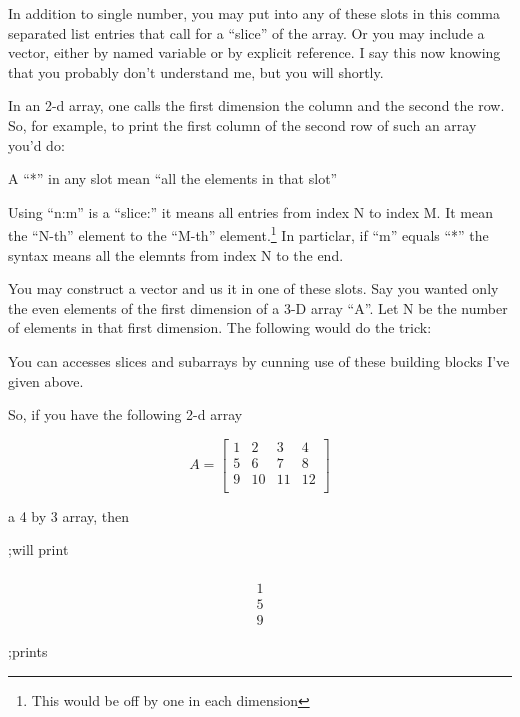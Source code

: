   In addition to single number, you may put into any of these slots in
  this comma separated list entries that call for a ``slice'' of the
  array. Or you may include a vector, either by named variable or by
  explicit reference. I say this now knowing that you probably don't
  understand me, but you will shortly.

  In an 2-d array, one calls the first dimension the column and the
  second the row. So, for example, to print the first column of the
  second row of such an array you'd do:



  A ``*'' in any slot mean ``all the elements in that slot''

  Using ``n:m'' is a ``slice:'' it means all entries from index N to
  index M. It  mean the ``N-th'' element to the
  ``M-th'' element.\footnote{This would be off by one in each
  dimension} In particlar, if ``m'' equals ``*'' the syntax means all
  the elemnts from index N to the end.

  You may construct a vector and us it in one of these slots. Say you
  wanted only the even elements of the first dimension of a 3-D
  array ``A''. Let N be the number of elements in that first dimension. The
  following would do the trick:



  You can accesses slices and subarrays by cunning use of these
  building blocks I've given above.

  So, if you have the following 2-d array

  \[ A = \left[ \begin{array}{cccc}
        1 & 2 & 3   & 4 \\
        5 & 6 & 7   & 8 \\
        9 & 10 & 11 & 12 \\
        \end{array} \right] \]

  a 4 by 3 array, then

   ;will print

   \[ \begin{array}{c}\\
        1 \\
        5 \\
        9 \end{array} \]

    ;prints


